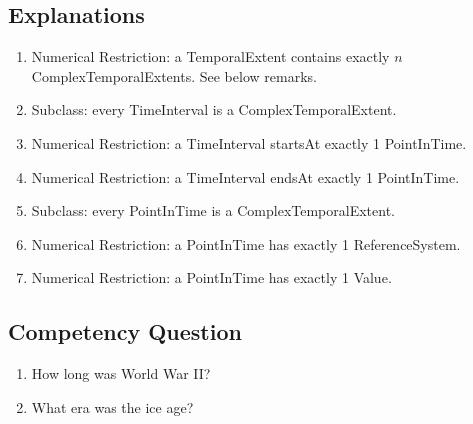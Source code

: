 \subsection{Explanations}
\label{exp:Temporal}
\begin{enumerate}
\item Numerical Restriction: a \textsf{TemporalExtent} \textsf{contains} exactly $n$ \textsf{ComplexTemporalExtents}. See below remarks.
\item Subclass: every \textsf{TimeInterval} is a \textsf{ComplexTemporalExtent}.
\item Numerical Restriction: a \textsf{TimeInterval} \textsf{startsAt} exactly 1 \textsf{PointInTime}.
\item Numerical Restriction: a \textsf{TimeInterval} \textsf{endsAt} exactly 1 \textsf{PointInTime}.
\item Subclass: every \textsf{PointInTime} is a \textsf{ComplexTemporalExtent}.
\item Numerical Restriction: a \textsf{PointInTime} has exactly 1 \textsf{ReferenceSystem}.
\item Numerical Restriction: a \textsf{PointInTime} has exactly 1 \textsf{Value}.
\end{enumerate}

\subsection{Competency Question}
\label{cqs:Temporal}
\begin{enumerate}[CQ1.]
\item How long was World War II?
\item What era was the ice age?
\end{enumerate}

\newpage
